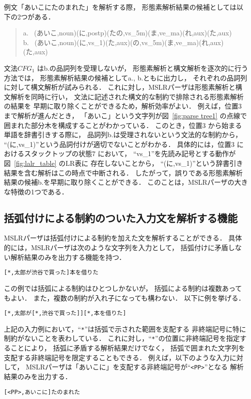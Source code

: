 例文「あいこにたのまれた」を解析する際，
形態素解析結果の候補としては以下の2つがある．
\begin{quote}
  a.~ (あいこ,noun)(に,postp)(たの,vs\_5m)(ま,ve\_ma)(れ,aux)(た,aux)\\
  b.~ (あいこ,noun)(に,vs\_1)(た,aux)(の,vs\_5m)(ま,ve\_ma)(れ,aux)(た,aux)
\end{quote}
文法$CFG_1$ はb.の品詞列を受理しないが，
形態素解析と構文解析を逐次的に行う方法では，
形態素解析結果の候補としてa., b.ともに出力し，
それぞれの品詞列に対して構文解析が試みられる．
これに対し，MSLRパーザは形態素解析と構文解析を同時に行い，
文法に記述された構文的な制約で排除される形態素解析の結果を
早期に取り除くことができるため，解析効率がよい．
例えば，位置$3$ まで解析が進んだとき，
「あいこ」という文字列が図~\ref{fig:parse tree1} の点線で
囲まれた部分木を構成することがわかっている．
このとき，位置$3$ から始まる単語を辞書引きする際に，
品詞列b.は受理されないという文法的な制約から，
``(に,vs\_1)''という品詞付けが適切でないことがわかる．
具体的には，位置$3$ におけるスタックトップの状態$7$ において，
``vs\_1''を先読み記号とする動作が図~\ref{fig:lalr_table} のLR表に
存在しないことから，
``(に,vs\_1)''という辞書引き結果を含む解析はこの時点で中断される．
したがって，誤りである形態素解析結果の候補b.を早期に取り除くことができる．
このことは，MSLRパーザの大きな特徴の1つである．

\subsection{括弧付けによる制約のついた入力文を解析する機能}
\label{sec:brackets}

MSLRパーザは括弧付けによる制約を加えた文を解析することができる．
具体的には，MSLRパーザは次のような文字列を入力として，
括弧付けに矛盾しない解析結果のみを出力する機能を持つ．
\begin{center}
  \verb|[*,太郎が渋谷で買った]本を借りた|
\end{center}
この例では括弧による制約はひとつしかないが，
括弧による制約は複数あってもよい．
また，複数の制約が入れ子になっても構わない．
以下に例を挙げる．
\begin{center}
  \verb|[*,太郎が[*,渋谷で買った]][*,本を借りた]|
\end{center}

上記の入力例において，``\verb|*|''は括弧で示された範囲を支配する
非終端記号に特に制約がないことを表わしている．
これに対し，``\verb|*|''の位置に非終端記号を指定することにより，
括弧に矛盾する解析結果だけでなく，
括弧で囲まれた文字列を支配する非終端記号を限定することもできる．
例えば，以下のような入力に対して，
MSLRパーザは「あいこに」を支配する非終端記号が``\verb|<PP>|''となる
解析結果のみを出力する．
\begin{center}
  \verb|[<PP>,あいこに]たのまれた|
\end{center}

